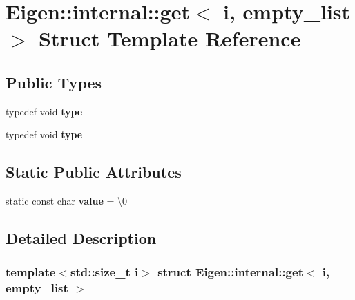 \hypertarget{struct_eigen_1_1internal_1_1get_3_01i_00_01empty__list_01_4}{}\section{Eigen\+:\+:internal\+:\+:get$<$ i, empty\+\_\+list $>$ Struct Template Reference}
\label{struct_eigen_1_1internal_1_1get_3_01i_00_01empty__list_01_4}
\subsection*{Public Types}
\begin{DoxyCompactItemize}
\item 
\mbox{\label{struct_eigen_1_1internal_1_1get_3_01i_00_01empty__list_01_4_a3a759885d311448c87d205defa33341a}} 
typedef void {\bfseries type}
\item 
\mbox{\label{struct_eigen_1_1internal_1_1get_3_01i_00_01empty__list_01_4_a3a759885d311448c87d205defa33341a}} 
typedef void {\bfseries type}
\end{DoxyCompactItemize}
\subsection*{Static Public Attributes}
\begin{DoxyCompactItemize}
\item 
\mbox{\label{struct_eigen_1_1internal_1_1get_3_01i_00_01empty__list_01_4_a7d2857b3af92f2141dfe86868722aa9f}} 
static const char {\bfseries value} = \textquotesingle{}\textbackslash{}0\textquotesingle{}
\end{DoxyCompactItemize}


\subsection{Detailed Description}
\subsubsection*{template$<$std\+::size\+\_\+t i$>$\newline
struct Eigen\+::internal\+::get$<$ i, empty\+\_\+list $>$}



